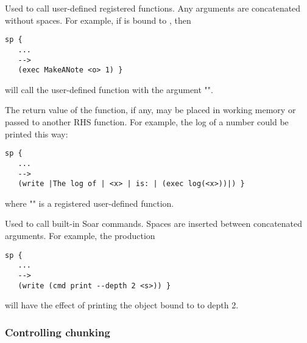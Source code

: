 \begin{description}
\item [\soarb{exec} --- ] Used to call user-defined registered functions. Any arguments are concatenated
without spaces. For example, if  is bound to , then

\begin{verbatim}
sp {
   ...
   -->
   (exec MakeANote <o> 1) }
\end{verbatim}
   
will call the user-defined  function with the argument "".

The return value of the function, if any, may be placed in working memory or passed
to another RHS function. For example, the log of a number  could be printed this way:

\begin{verbatim}
sp {
   ...
   -->
   (write |The log of | <x> | is: | (exec log(<x>))|) }
\end{verbatim}

where "" is a registered user-defined function.

\item[\soarb{cmd} --- ] Used to call built-in Soar commands. Spaces are inserted between concatenated 
arguments. For example, the production

\begin{verbatim}
sp {
   ...
   -->
   (write (cmd print --depth 2 <s>)) }
\end{verbatim}

will have the effect of printing the object bound to  to depth 2.
\end{description}


\subsubsection{Controlling chunking}
\label{SYNTAX-pm-actions-learning}



